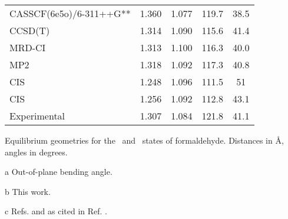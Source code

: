 \begin{center}
\begin{threeparttable}
\begin{tabular*}{\textwidth}{l@{\hspace*{35mm}}cccc}
CASSCF(6e5o)/6-311++G**\cite{jms-480-263-1999}      &  1.360  &  1.077   &    119.7  &   38.5 \\
CCSD(T)\cite{jcp-108-5281-1998}& 1.314  &  1.090   &    115.6  &   41.4 \\
MRD-CI\cite{jpc-99-16576-1995}&  1.313  &  1.100   &    116.3  &   40.0 \\
MP2\cite{jpc-99-16576-1995}   &  1.318  &  1.092   &    117.3  &   40.8 \\
CIS\cite{jpc-97-4293-1993}   &  1.248  &  1.096   &    111.5  &   51   \\
CIS\cite{jpc-96-135-1992}   &  1.256  &  1.092   &    112.8  &   43.1 \\
Experimental\tnote{c} &  1.307  &  1.084   &    121.8  &   41.1 \\
\hline
\end{tabular*}
\caption{\footnotesize Equilibrium geometries for the \snpi\ and \tnpi\ states of formaldehyde.
Distances in \AA, angles in degrees.}\label{tbl:exc_geom_form_npi}
\begin{tablenotes}
\footnotesize
\item[a] Out-of-plane bending angle.
\item[b] This work.
\item[c] Refs.  and 
as cited in Ref. .
\end{tablenotes}
\end{threeparttable}
\end{center}
